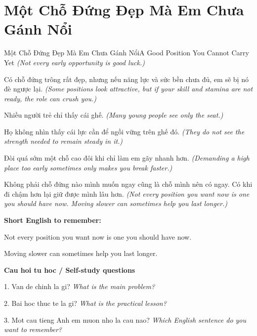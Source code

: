 \section{Một Chỗ Đứng Đẹp Mà Em Chưa Gánh Nổi}
\begin{truyen}{Một Chỗ Đứng Đẹp Mà Em Chưa Gánh Nổi}{A Good Position You Cannot Carry Yet}
\textit{(Not every early opportunity is good luck.)}

Có chỗ đứng trông rất đẹp, nhưng nếu năng lực và sức bền chưa đủ, em sẽ bị nó đè ngược lại.
\textit{(Some positions look attractive, but if your skill and stamina are not ready, the role can crush you.)}

Nhiều người trẻ chỉ thấy cái ghế.
\textit{(Many young people see only the seat.)}

Họ không nhìn thấy cái lực cần để ngồi vững trên ghế đó.
\textit{(They do not see the strength needed to remain steady in it.)}

Đòi quá sớm một chỗ cao đôi khi chỉ làm em gãy nhanh hơn.
\textit{(Demanding a high place too early sometimes only makes you break faster.)}

\end{truyen}

\begin{baihoc}
Không phải chỗ đứng nào mình muốn ngay cũng là chỗ mình nên có ngay. Có khi đi chậm hơn lại giữ được mình lâu hơn.
\textit{(Not every position you want now is one you should have now. Moving slower can sometimes help you last longer.)}
\end{baihoc}

\begin{ghinhoanh}
\textbf{Short English to remember:}

Not every position you want now is one you should have now.

Moving slower can sometimes help you last longer.

\end{ghinhoanh}

\begin{tuhocnhanh}
\textbf{Cau hoi tu hoc / Self-study questions}

1. Van de chinh la gi? \textit{What is the main problem?}

2. Bai hoc thuc te la gi? \textit{What is the practical lesson?}

3. Mot cau tieng Anh em muon nho la cau nao? \textit{Which English sentence do you want to remember?}
\end{tuhocnhanh}
\ngancach

